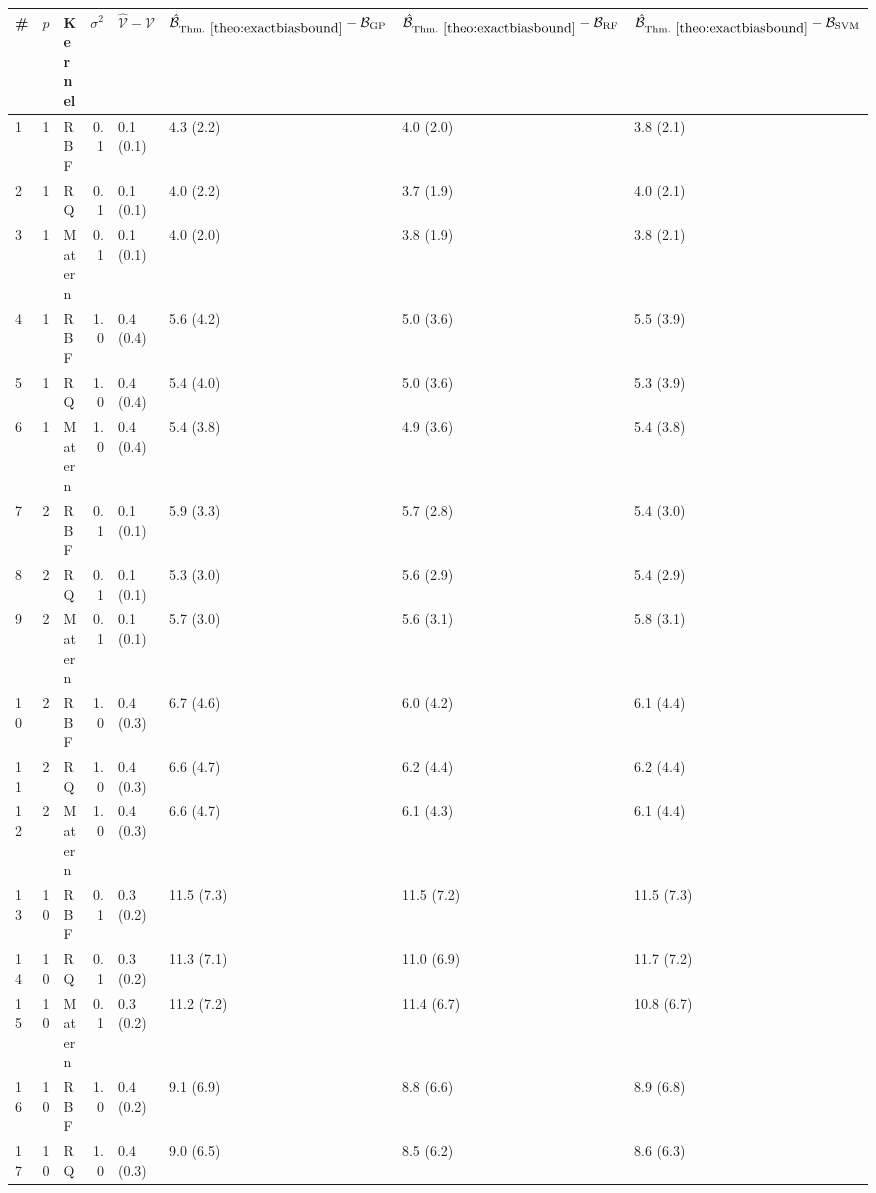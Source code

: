 \begin{tabular}{lrlrllll}
  \toprule
\# & $p$ & Kernel & $\sigma^2$ & $\hat{\mathcal{V}} - \mathcal{V}$ & $\hat{\mathcal{B}}_{\mathrm{Thm.}~\ref{theo:exactbiasbound}} - \mathcal{B}_{\mathrm{GP}}$ & $\hat{\mathcal{B}}_{\mathrm{Thm.}~\ref{theo:exactbiasbound}} - \mathcal{B}_{\mathrm{RF}}$ & $\hat{\mathcal{B}}_{\mathrm{Thm.}~\ref{theo:exactbiasbound}} - \mathcal{B}_{\mathrm{SVM}}$ \\ 
  \midrule
\textsc{1} &  1 & RBF & 0.1 & 0.1 (0.1) & 4.3 (2.2) & 4.0 (2.0) & 3.8 (2.1) \\ 
  \textsc{2} &  1 & RQ & 0.1 & 0.1 (0.1) & 4.0 (2.2) & 3.7 (1.9) & 4.0 (2.1) \\ 
  \textsc{3} &  1 & Matern & 0.1 & 0.1 (0.1) & 4.0 (2.0) & 3.8 (1.9) & 3.8 (2.1) \\ 
  \textsc{4} &  1 & RBF & 1.0 & 0.4 (0.4) & 5.6 (4.2) & 5.0 (3.6) & 5.5 (3.9) \\ 
  \textsc{5} &  1 & RQ & 1.0 & 0.4 (0.4) & 5.4 (4.0) & 5.0 (3.6) & 5.3 (3.9) \\ 
  \textsc{6} &  1 & Matern & 1.0 & 0.4 (0.4) & 5.4 (3.8) & 4.9 (3.6) & 5.4 (3.8) \\ 
  \textsc{7} &  2 & RBF & 0.1 & 0.1 (0.1) & 5.9 (3.3) & 5.7 (2.8) & 5.4 (3.0) \\ 
  \textsc{8} &  2 & RQ & 0.1 & 0.1 (0.1) & 5.3 (3.0) & 5.6 (2.9) & 5.4 (2.9) \\ 
  \textsc{9} &  2 & Matern & 0.1 & 0.1 (0.1) & 5.7 (3.0) & 5.6 (3.1) & 5.8 (3.1) \\ 
  \textsc{10} &  2 & RBF & 1.0 & 0.4 (0.3) & 6.7 (4.6) & 6.0 (4.2) & 6.1 (4.4) \\ 
  \textsc{11} &  2 & RQ & 1.0 & 0.4 (0.3) & 6.6 (4.7) & 6.2 (4.4) & 6.2 (4.4) \\ 
  \textsc{12} &  2 & Matern & 1.0 & 0.4 (0.3) & 6.6 (4.7) & 6.1 (4.3) & 6.1 (4.4) \\ 
  \textsc{13} & 10 & RBF & 0.1 & 0.3 (0.2) & 11.5 (7.3) & 11.5 (7.2) & 11.5 (7.3) \\ 
  \textsc{14} & 10 & RQ & 0.1 & 0.3 (0.2) & 11.3 (7.1) & 11.0 (6.9) & 11.7 (7.2) \\ 
  \textsc{15} & 10 & Matern & 0.1 & 0.3 (0.2) & 11.2 (7.2) & 11.4 (6.7) & 10.8 (6.7) \\ 
  \textsc{16} & 10 & RBF & 1.0 & 0.4 (0.2) & 9.1 (6.9) & 8.8 (6.6) & 8.9 (6.8) \\ 
  \textsc{17} & 10 & RQ & 1.0 & 0.4 (0.3) & 9.0 (6.5) & 8.5 (6.2) & 8.6 (6.3) \\ 

\end{tabular}
